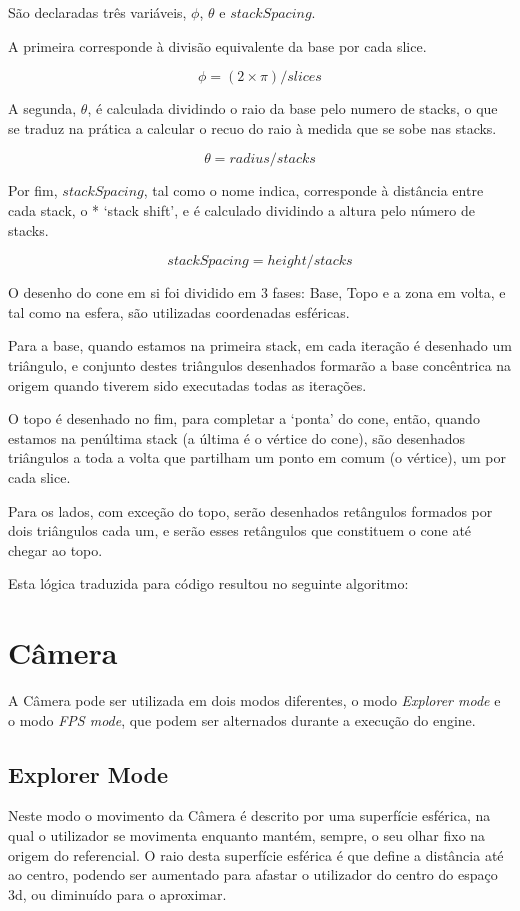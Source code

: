\documentclass[a4paper]{article}
\begin{document}
São declaradas três variáveis, $\phi$, $\theta$ e $stackSpacing$.

A primeira corresponde à divisão equivalente da base por cada slice.

\[\phi = (2 \times \pi) / slices\]

A segunda, $\theta$, é calculada dividindo o raio da base pelo numero de stacks, o que se traduz na prática a calcular o recuo do raio à medida que se sobe nas stacks.

\[\theta = radius / stacks\]

Por fim, $stackSpacing$, tal como o nome indica, corresponde à distância entre cada stack, o *  `stack shift', e é calculado dividindo a altura pelo número de stacks.


\[stackSpacing = height / stacks\]


O desenho do cone em si foi dividido em 3 fases: Base, Topo e a zona em volta, e tal como na esfera, são utilizadas coordenadas esféricas.

Para a base, quando estamos na primeira stack, em cada iteração é desenhado um triângulo, e conjunto destes triângulos desenhados formarão a base concêntrica na origem quando tiverem sido executadas todas as iterações.

O topo é desenhado no fim, para completar a `ponta' do cone, então, quando estamos na penúltima stack (a última é o vértice do cone), são desenhados triângulos a toda a volta que partilham um ponto em comum (o vértice), um por cada slice.

Para os lados, com exceção do topo, serão desenhados retângulos formados por dois triângulos cada um, e serão esses retângulos que constituem o cone até chegar ao topo.

Esta lógica traduzida para código resultou no seguinte algoritmo:


\section{Câmera}
A Câmera pode ser utilizada em dois modos diferentes, o modo \textit{Explorer mode} e o modo \textit{FPS mode}, que podem ser alternados durante a execução do engine.

\subsection{Explorer Mode}

Neste modo o movimento da Câmera é descrito por uma superfície esférica, na qual o utilizador se movimenta enquanto mantém, sempre, o seu olhar fixo na origem do referencial. O raio desta superfície esférica é que define a distância até ao centro, podendo ser aumentado para afastar o utilizador do centro do espaço 3d, ou diminuído para o aproximar.
\end{document}
